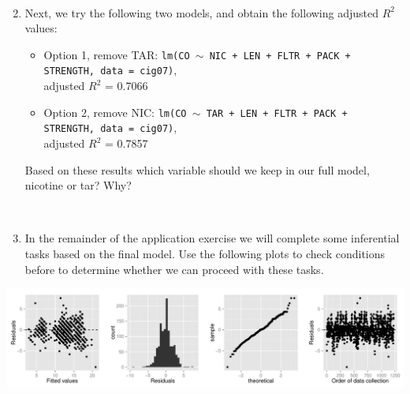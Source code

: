 \documentclass[11pt]{article}
\newcommand{\soln}[2]{$\:$\\ \vspace{#1}}{}
\begin{document}
\begin{enumerate}
$\:$

%

\item Next, we try the following two models, and obtain the following adjusted $R^2$ values:
\begin{itemize}
\item Option 1, remove TAR: \texttt{lm(CO $\sim$ NIC + LEN + FLTR + PACK + STRENGTH, data = cig07)}, \\
adjusted $R^2$ = 0.7066
\item Option 2, remove NIC: \texttt{lm(CO $\sim$ TAR + LEN + FLTR + PACK + STRENGTH, data = cig07)}, \\
adjusted $R^2$ = 0.7857
\end{itemize}
Based on these results which variable should we keep in our full model, nicotine or tar? Why?

\soln{1cm}{Remove nicotine, higher adjusted $R^2$.}

%

\item In the remainder of the application exercise we will complete some inferential tasks based on the
final model. Use the following plots to check conditions before to determine whether we can proceed with these tasks.

\end{enumerate}

\includegraphics[width=\textwidth]{diag.pdf}

\soln{1cm}{
\begin{enumerate}
\item Linearity -- residuals scattered around 0, but there is some structure, may not be met.
\item Nearly normal residuals -- mostly met.
\item Constant variance -- residuals plot does not have an apparent fan shape.
\item Independence -- no apparent structure due to order of data collection, but we would like
to know about data collection methods (i.e. how were these cigarettes selected)
\end{enumerate}
}

%
\end{document}
